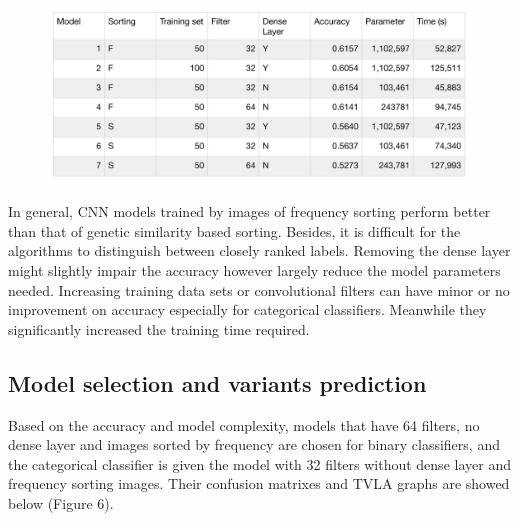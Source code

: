 \documentclass[a4paper,12pt,oneside]{extarticle}
\begin{document}
\begin{figure}[H] 
  \captionsetup{singlelinecheck = false, justification=justified}
  \centering
  \includegraphics[trim = 0 5mm 0 5mm, clip,width=1\textwidth]{table5.png}
\end{figure}


In general, CNN models trained by images of frequency sorting perform better than that of genetic similarity based sorting. Besides, it is difficult for the algorithms to distinguish between closely ranked labels. Removing the dense layer might slightly impair the accuracy however largely reduce the model parameters needed. Increasing training data sets or convolutional filters can have minor or no improvement on accuracy especially for categorical classifiers. Meanwhile they significantly increased the training time required. 
 
 
\subsection{Model selection and variants prediction}
Based on the accuracy and model complexity, models that have 64 filters, no dense layer and images sorted by frequency are chosen for binary classifiers, and the categorical classifier is given the model with 32 filters without dense layer and frequency sorting images. Their confusion matrixes and TVLA graphs are showed below (Figure 6).
\end{document}
